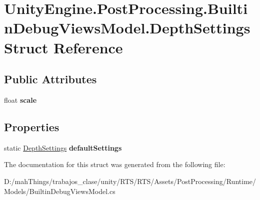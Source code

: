 \hypertarget{struct_unity_engine_1_1_post_processing_1_1_builtin_debug_views_model_1_1_depth_settings}{}\section{Unity\+Engine.\+Post\+Processing.\+Builtin\+Debug\+Views\+Model.\+Depth\+Settings Struct Reference}
\label{struct_unity_engine_1_1_post_processing_1_1_builtin_debug_views_model_1_1_depth_settings}
\subsection*{Public Attributes}
\begin{DoxyCompactItemize}
\item 
\mbox{\label{struct_unity_engine_1_1_post_processing_1_1_builtin_debug_views_model_1_1_depth_settings_a42df42d4c46463f482eb4221558d70f6}} 
float {\bfseries scale}
\end{DoxyCompactItemize}
\subsection*{Properties}
\begin{DoxyCompactItemize}
\item 
\mbox{\label{struct_unity_engine_1_1_post_processing_1_1_builtin_debug_views_model_1_1_depth_settings_a1270abe980a84e80675fad750ff67b0d}} 
static \mbox{\hyperlink{struct_unity_engine_1_1_post_processing_1_1_builtin_debug_views_model_1_1_depth_settings}{Depth\+Settings}} {\bfseries default\+Settings}
\end{DoxyCompactItemize}


The documentation for this struct was generated from the following file\+:\begin{DoxyCompactItemize}
\item 
D\+:/mah\+Things/trabajos\+\_\+clase/unity/\+R\+T\+S/\+R\+T\+S/\+Assets/\+Post\+Processing/\+Runtime/\+Models/Builtin\+Debug\+Views\+Model.\+cs\end{DoxyCompactItemize}
